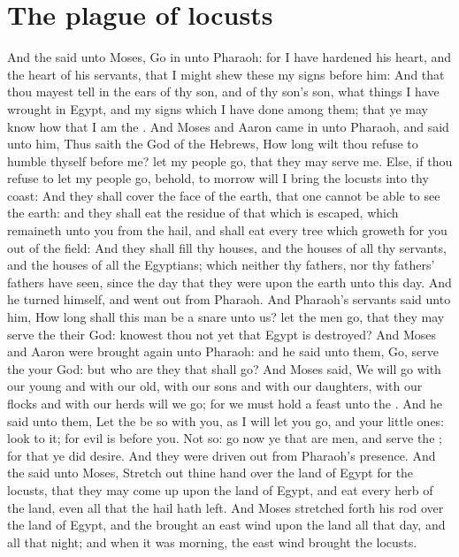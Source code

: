 \section*{The plague of locusts}
\begin{biblechapter} %
\verse And the \LORD said unto Moses, Go in unto Pharaoh: for I have hardened his heart, and the heart of his servants, that I might shew these my signs before him:
\verse And that thou mayest tell in the ears of thy son, and of thy son's son, what things I have wrought in Egypt, and my signs which I have done among them; that ye may know how that I am the \LORD.
\verse And Moses and Aaron came in unto Pharaoh, and said unto him, Thus saith the \LORD God of the Hebrews, How long wilt thou refuse to humble thyself before me? let my people go, that they may serve me.
\verse Else, if thou refuse to let my people go, behold, to morrow will I bring the locusts into thy coast:
\verse And they shall cover the face of the earth, that one cannot be able to see the earth: and they shall eat the residue of that which is escaped, which remaineth unto you from the hail, and shall eat every tree which groweth for you out of the field:
\verse And they shall fill thy houses, and the houses of all thy servants, and the houses of all the Egyptians; which neither thy fathers, nor thy fathers' fathers have seen, since the day that they were upon the earth unto this day. And he turned himself, and went out from Pharaoh.
\verse And Pharaoh's servants said unto him, How long shall this man be a snare unto us? let the men go, that they may serve the \LORD their God: knowest thou not yet that Egypt is destroyed?
\verse And Moses and Aaron were brought again unto Pharaoh: and he said unto them, Go, serve the \LORD your God: but who are they that shall go?
\verse And Moses said, We will go with our young and with our old, with our sons and with our daughters, with our flocks and with our herds will we go; for we must hold a feast unto the \LORD.
\verse And he said unto them, Let the \LORD be so with you, as I will let you go, and your little ones: look to it; for evil is before you.
\verse Not so: go now ye that are men, and serve the \LORD; for that ye did desire. And they were driven out from Pharaoh's presence.
\verse And the \LORD said unto Moses, Stretch out thine hand over the land of Egypt for the locusts, that they may come up upon the land of Egypt, and eat every herb of the land, even all that the hail hath left.
\verse And Moses stretched forth his rod over the land of Egypt, and the \LORD brought an east wind upon the land all that day, and all that night; and when it was morning, the east wind brought the locusts.

\end{biblechapter}
